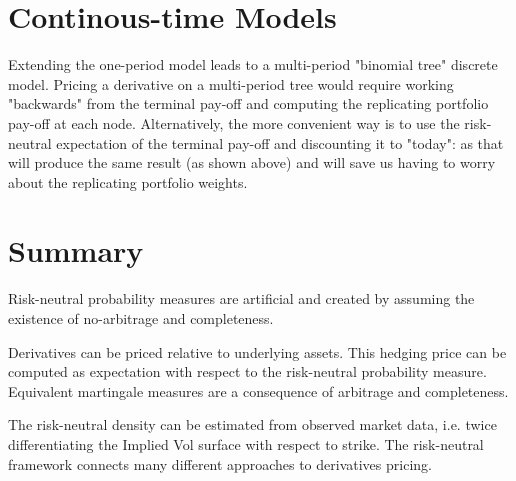 \section{Continous-time Models}
Extending the one-period model leads to a multi-period "binomial tree" discrete model. Pricing a derivative on a multi-period tree would require working "backwards" from the terminal pay-off and computing the replicating portfolio pay-off at each node. Alternatively, the more convenient way is to use the risk-neutral expectation of the terminal pay-off and discounting it to "today": as that will produce the same result (as shown above) and will save us having to worry about the replicating portfolio weights.

%
%
%
%
%
%
%
%
%
%
%
%
%
%
%
%
%

\section{Summary}

Risk-neutral probability measures are artificial and created by assuming the existence of no-arbitrage and completeness.

Derivatives can be priced relative to underlying assets. This hedging price can be computed as expectation with respect to the risk-neutral probability measure. Equivalent martingale measures are a consequence of arbitrage and completeness.

The risk-neutral density can be estimated from observed market data, i.e. twice differentiating the Implied Vol surface with respect to strike. The risk-neutral framework connects many different approaches to derivatives pricing.
